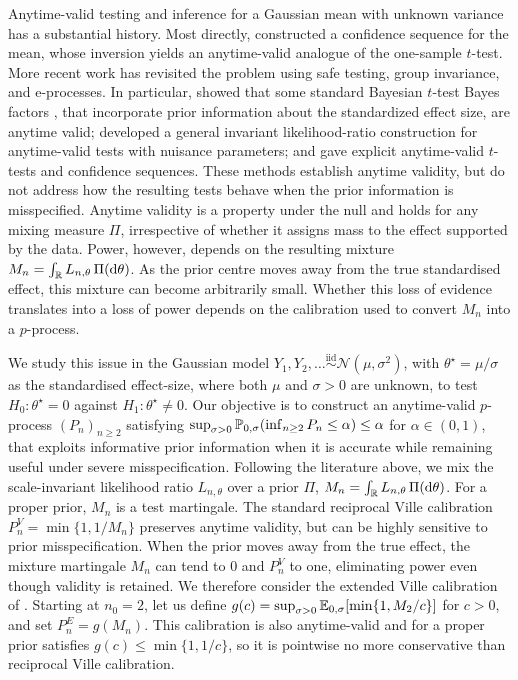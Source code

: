 \documentclass{article}
\begin{document}
Anytime-valid testing and inference for a Gaussian mean with unknown variance has a substantial history. Most directly, \citet{Lai1976} constructed a confidence sequence for the mean, whose inversion yields an anytime-valid analogue of the one-sample $t$-test. More recent work has revisited the problem using safe testing, group invariance, and e-processes. In particular, \citet{Grunwald2024} showed that some standard Bayesian $t$-test Bayes factors \citep{Jeffreys1961,Zellner1980,Rouder2009,Gronau2020}, that incorporate prior information about the standardized effect size, are anytime valid; \citet{PerezOrtiz2024} developed a general invariant likelihood-ratio construction for anytime-valid tests with nuisance parameters; and \citet{Wang2025} gave explicit anytime-valid $t$-tests and confidence sequences. These methods establish anytime validity, but do not address how the resulting tests behave when the prior information is misspecified. Anytime validity is a property under the null and holds for any mixing measure $\Pi$, irrespective of whether it assigns mass to the effect supported by the data. Power, however, depends on the resulting mixture $M_n=\int_{\mathbb{R}}L_{n,\theta} \, \Pi(\mathrm{d}\theta)$. As the prior centre moves away from the true standardised effect, this mixture can become arbitrarily small. Whether this loss of evidence translates into a loss of power depends on the calibration used to convert $M_n$ into a $p$-process.  

We study this issue in the Gaussian model $Y_1,Y_2,\ldots \stackrel{\mathrm{iid}}{\sim}\mathcal N(\mu,\sigma^2)$, with $\theta^\star=\mu/\sigma$ as the standardised effect-size, where both $\mu$ and $\sigma>0$ are unknown, to test $H_0:\theta^\star=0$ against $H_1:\theta^\star\neq0$. Our objective is to construct an anytime-valid $p$-process $(P_n)_{n\geq2}$ satisfying $\sup_{\sigma>0}\mathbb{P}_{0,\sigma}(\inf_{n\geq2}P_n\leq\alpha)\leq\alpha$
for $\alpha\in(0,1)$, that exploits informative prior information when it is accurate while remaining useful under severe misspecification. Following the literature above, we mix the scale-invariant likelihood ratio $L_{n,\theta}$ over a prior $\Pi$, $M_n=\int_{\mathbb{R}} L_{n,\theta}\,\Pi(\mathrm{d}\theta)$. For a proper prior, $M_n$ is a test martingale. The standard reciprocal Ville calibration $P_n^V=\min\{1,1/M_n\}$ \citep{Ville1939,Shafer2011,Ramdas2023} preserves anytime validity, but can be highly sensitive to prior misspecification. When the prior moves away from the true effect, the mixture martingale $M_n$ can tend to $0$ and $P_n^V$ to one, eliminating power even though validity is retained. We therefore consider the extended Ville calibration of \citet{Wang2025a}. Starting at $n_0=2$, let us define
$g(c)=\sup_{\sigma>0}\mathbb{E}_{0,\sigma}[\min\{1,M_2/c\}]$ for $c>0$, and set $P_n^E=g(M_n)$. This calibration is also  anytime-valid and for a proper prior satisfies $g(c)\leq\min\{1,1/c\}$, so it is pointwise no more conservative than reciprocal Ville calibration. 
\end{document}
